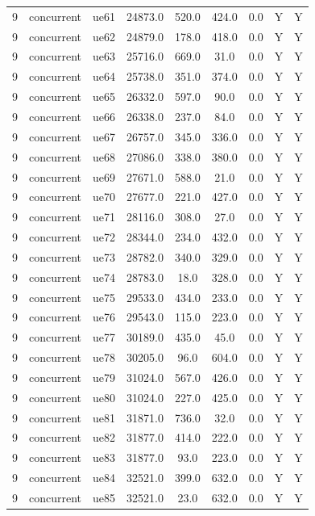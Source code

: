 \begin{table}[ht]
\begin{tabular}{|c|c|c|c|c|c|c|c|c|}
9 & concurrent & ue61 & 24873.0 & 520.0 & 424.0 & 0.0 & Y & Y \\
9 & concurrent & ue62 & 24879.0 & 178.0 & 418.0 & 0.0 & Y & Y \\
9 & concurrent & ue63 & 25716.0 & 669.0 & 31.0 & 0.0 & Y & Y \\
9 & concurrent & ue64 & 25738.0 & 351.0 & 374.0 & 0.0 & Y & Y \\
9 & concurrent & ue65 & 26332.0 & 597.0 & 90.0 & 0.0 & Y & Y \\
9 & concurrent & ue66 & 26338.0 & 237.0 & 84.0 & 0.0 & Y & Y \\
9 & concurrent & ue67 & 26757.0 & 345.0 & 336.0 & 0.0 & Y & Y \\
9 & concurrent & ue68 & 27086.0 & 338.0 & 380.0 & 0.0 & Y & Y \\
9 & concurrent & ue69 & 27671.0 & 588.0 & 21.0 & 0.0 & Y & Y \\
9 & concurrent & ue70 & 27677.0 & 221.0 & 427.0 & 0.0 & Y & Y \\
9 & concurrent & ue71 & 28116.0 & 308.0 & 27.0 & 0.0 & Y & Y \\
9 & concurrent & ue72 & 28344.0 & 234.0 & 432.0 & 0.0 & Y & Y \\
9 & concurrent & ue73 & 28782.0 & 340.0 & 329.0 & 0.0 & Y & Y \\
9 & concurrent & ue74 & 28783.0 & 18.0 & 328.0 & 0.0 & Y & Y \\
9 & concurrent & ue75 & 29533.0 & 434.0 & 233.0 & 0.0 & Y & Y \\
9 & concurrent & ue76 & 29543.0 & 115.0 & 223.0 & 0.0 & Y & Y \\
9 & concurrent & ue77 & 30189.0 & 435.0 & 45.0 & 0.0 & Y & Y \\
9 & concurrent & ue78 & 30205.0 & 96.0 & 604.0 & 0.0 & Y & Y \\
9 & concurrent & ue79 & 31024.0 & 567.0 & 426.0 & 0.0 & Y & Y \\
9 & concurrent & ue80 & 31024.0 & 227.0 & 425.0 & 0.0 & Y & Y \\
9 & concurrent & ue81 & 31871.0 & 736.0 & 32.0 & 0.0 & Y & Y \\
9 & concurrent & ue82 & 31877.0 & 414.0 & 222.0 & 0.0 & Y & Y \\
9 & concurrent & ue83 & 31877.0 & 93.0 & 223.0 & 0.0 & Y & Y \\
9 & concurrent & ue84 & 32521.0 & 399.0 & 632.0 & 0.0 & Y & Y \\
9 & concurrent & ue85 & 32521.0 & 23.0 & 632.0 & 0.0 & Y & Y \\

\end{tabular}
\end{table}
